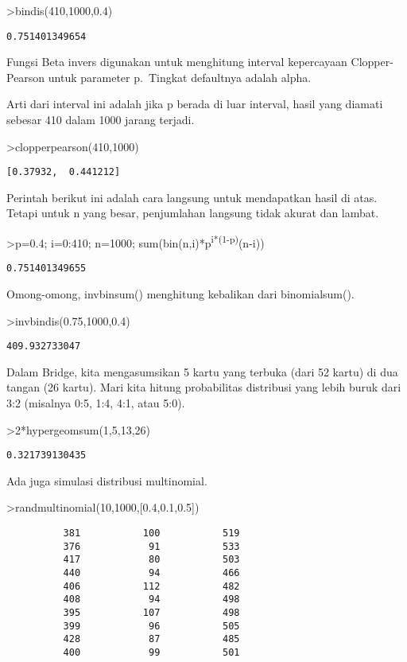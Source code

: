 \documentclass[
]{book}
\begin{document}
\textgreater bindis(410,1000,0.4)

\begin{verbatim}
0.751401349654
\end{verbatim}

Fungsi Beta invers digunakan untuk menghitung interval kepercayaan Clopper-Pearson untuk parameter p.~Tingkat defaultnya adalah alpha.

Arti dari interval ini adalah jika p berada di luar interval, hasil yang diamati sebesar 410 dalam 1000 jarang terjadi.

\textgreater clopperpearson(410,1000)

\begin{verbatim}
[0.37932,  0.441212]
\end{verbatim}

Perintah berikut ini adalah cara langsung untuk mendapatkan hasil di atas. Tetapi untuk n yang besar, penjumlahan langsung tidak akurat dan lambat.

\textgreater p=0.4; i=0:410; n=1000; sum(bin(n,i)*p\textsuperscript{i*(1-p)}(n-i))

\begin{verbatim}
0.751401349655
\end{verbatim}

Omong-omong, invbinsum() menghitung kebalikan dari binomialsum().

\textgreater invbindis(0.75,1000,0.4)

\begin{verbatim}
409.932733047
\end{verbatim}

Dalam Bridge, kita mengasumsikan 5 kartu yang terbuka (dari 52 kartu) di dua tangan (26 kartu). Mari kita hitung probabilitas distribusi yang lebih buruk dari 3:2 (misalnya 0:5, 1:4, 4:1, atau 5:0).

\textgreater2*hypergeomsum(1,5,13,26)

\begin{verbatim}
0.321739130435
\end{verbatim}

Ada juga simulasi distribusi multinomial.

\textgreater randmultinomial(10,1000,{[}0.4,0.1,0.5{]})

\begin{verbatim}
          381           100           519 
          376            91           533 
          417            80           503 
          440            94           466 
          406           112           482 
          408            94           498 
          395           107           498 
          399            96           505 
          428            87           485 
          400            99           501 
\end{verbatim}
\end{document}
